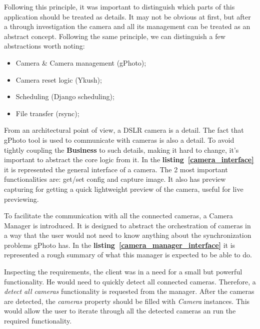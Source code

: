 \vspace{0.3cm}
Following this principle, it was important to distinguish which parts of this application should be treated as details. It may not be obvious at first, but after a through investigation the camera and all its management can be treated as an abstract concept. Following the same principle, we can distinguish a few abstractions worth noting:
\begin{itemize}
    \item Camera \& Camera management (gPhoto);
    \item Camera reset logic (Ykush);
    \item Scheduling (Django scheduling);
    \item File transfer (rsync);
\end{itemize}

\vspace{0.3cm}
From an architectural point of view, a DSLR camera is a detail. The fact that gPhoto tool is used to communicate with cameras is also a detail. To avoid tightly coupling the \textbf{Business} to such details, making it hard to change, it's important to abstract the core logic from it. In the \textbf{\mbox{listing \ref{camera_interface}}} it is represented the general interface of a camera. The 2 most important functionalities are: get/set config and capture image. It also has preview capturing for getting a quick lightweight preview of the camera, useful for live previewing.

\vspace{0.3cm}


\vspace{0.3cm}
To facilitate the communication with all the connected cameras, a Camera Manager is introduced. It is designed to abstract the orchestration of cameras in a way that the user would not need to know anything about the synchronization problems gPhoto has. In the \textbf{\mbox{listing \ref{camera_manager_interface}}} it is represented a rough summary of what this manager is expected to be able to do.

\vspace{0.3cm}


\vspace{0.3cm}
Inspecting the requirements, the client was in a need for a small but powerful functionality. He would need to quickly detect all connected cameras. Therefore, a \textit{detect all cameras} functionality is requested from the manager. After the cameras are detected, the \textit{cameras} property should be filled with \textit{Camera} instances. This would allow the user to iterate through all the detected cameras an run the required functionality.

